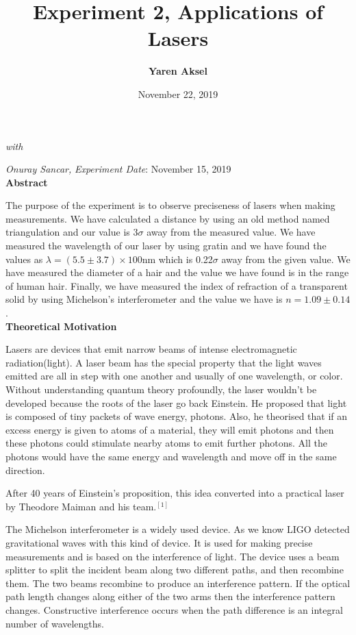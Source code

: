 \documentclass[11pt,a4paper]{article}
\begin{document}
	\author{\textbf{Yaren Aksel}}
	\title{\textbf{Experiment 2, Applications of Lasers}}
	\date{November 22, 2019}
	\maketitle
	\textit{with} {\large\textit{{Onuray Sancar}}\textit{,} \textit{Experiment Date}: November 15, 2019\\[2\baselineskip]
		\textbf{Abstract}\\[\baselineskip]
		\par The purpose of the experiment is to observe preciseness of lasers when making measurements. We have calculated a distance by using an old method named triangulation and our value is $3\sigma$ away from the measured value. We have measured the wavelength of our laser by using gratin and we have found the values as $\lambda=(5.5\pm3.7)\times100$nm which is 0.22$\sigma$ away from the given value. We have measured the diameter of a hair and the value we have found is in the range of human hair. Finally, we have measured the index of refraction of a transparent solid by using Michelson's interferometer and the value we have is $n=1.09\pm0.14$.
		\\[\baselineskip]
		\textbf{Theoretical Motivation}
		\\[\baselineskip]
		\par Lasers are devices that emit narrow beams of intense electromagnetic radiation(light). A laser beam has the special property that the light waves emitted are all in step with one another and usually of one wavelength, or color. Without understanding quantum theory profoundly, the laser wouldn't be developed because the roots of the laser go back Einstein. He proposed that light is composed of tiny packets of wave energy, photons. Also, he theorised that if an excess energy is given to atoms of a material, they will emit photons and then these photons could stimulate nearby atoms to emit further photons. All the photons would have the same energy and wavelength and move off in the same direction. 
		\par After 40 years of Einstein's proposition, this idea converted into a practical laser by Theodore Maiman and his team.$^{[1]}$
		\par The Michelson interferometer is a widely used device. As we know LIGO detected gravitational waves with this kind of device. It is used for making precise measurements and is
		based on the interference of light. The device uses a beam splitter to split the incident beam along two different paths, and then recombine them. The two beams recombine to produce an interference pattern. If the optical path length changes along either of the two arms then the interference pattern changes. Constructive interference occurs when the path difference is an integral number of wavelengths.
}
\end{document}
